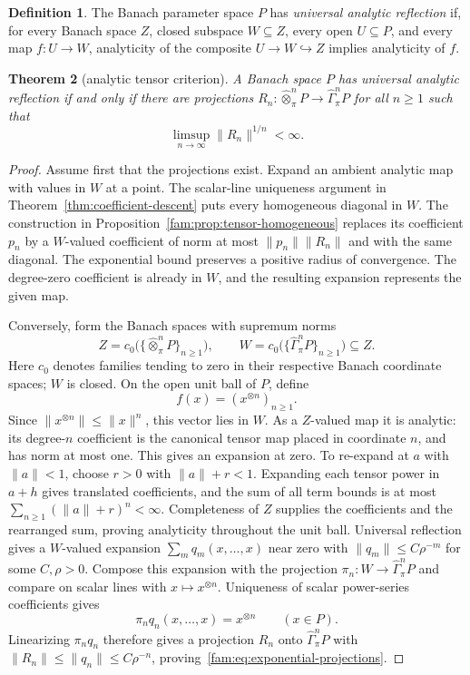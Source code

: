 \documentclass[11pt]{amsart}
\newtheorem{theorem}{Theorem}[section]
\theoremstyle{definition}
\newtheorem{definition}[theorem]{Definition}
\theoremstyle{remark}
\numberwithin{equation}{section}
\newcommand{\norm}[1]{\lVert #1\rVert}
\theoremstyle{plain}
\theoremstyle{definition}
\theoremstyle{plain}
\begin{document}
\begin{definition}\label{fam:def:universal-reflection}
The Banach parameter space $P$ has \emph{universal analytic reflection} if, for every Banach space $Z$, closed
subspace $W\subseteq Z$, every open $U\subseteq P$, and every map $f\colon U\to W$, analyticity of
the composite $U\to W\hookrightarrow Z$ implies analyticity of $f$.
\end{definition}

\begin{theorem}[analytic tensor criterion]\label{fam:thm:tensor-analytic}
A Banach space $P$ has universal analytic reflection if and only if there are projections
$R_n\colon \widehat\otimes^n_\pi P\to\widehat\Gamma^n_\pi P$ for all $n\ge1$ such that
\begin{equation}\label{fam:eq:exponential-projections}
 \limsup_{n\to\infty}\norm{R_n}^{1/n}<\infty.
\end{equation}
\end{theorem}

\begin{proof}
Assume first that the projections exist. Expand an ambient analytic map with values in $W$ at a point.
The scalar-line uniqueness argument in Theorem~\ref{thm:coefficient-descent} puts every homogeneous diagonal in $W$.
The construction in Proposition~\ref{fam:prop:tensor-homogeneous} replaces its coefficient $p_n$ by a
$W$\nobreakdash-valued coefficient of norm at most $\norm{p_n}\norm{R_n}$ and with the same diagonal.
The exponential bound preserves a positive radius of convergence. The degree-zero coefficient is
already in $W$, and the resulting expansion represents the given map.

Conversely, form the Banach spaces with supremum norms
\[
 Z=c_0\bigl(\{\widehat\otimes^n_\pi P\}_{n\ge1}\bigr),\qquad
 W=c_0\bigl(\{\widehat\Gamma^n_\pi P\}_{n\ge1}\bigr)\subseteq Z.
\]
Here $c_0$ denotes families tending to zero in their respective Banach coordinate spaces; $W$ is closed.
On the open unit ball of $P$, define
\[
 f(x)=(x^{\otimes n})_{n\ge1}.
\]
Since $\norm{x^{\otimes n}}\le\norm x^n$, this vector lies in $W$.
As a $Z$\nobreakdash-valued map it is analytic: its degree-$n$ coefficient is the canonical tensor map
placed in coordinate $n$, and has norm at most one. This gives an expansion at zero. To re-expand
at $a$ with $\norm a<1$, choose $r>0$ with $\norm a+r<1$. Expanding each tensor power in $a+h$
gives translated coefficients, and the sum of all term bounds is at most
$\sum_{n\ge1}(\norm a+r)^n<\infty$. Completeness of $Z$ supplies the coefficients and the
rearranged sum, proving analyticity throughout the unit ball. Universal reflection gives a $W$\nobreakdash-valued
expansion $\sum_mq_m(x,\ldots,x)$ near zero with $\norm{q_m}\le C\rho^{-m}$ for some $C,\rho>0$.
Compose this expansion with the projection $\pi_n\colon W\to\widehat\Gamma^n_\pi P$ and compare on scalar lines
with $x\mapsto x^{\otimes n}$. Uniqueness of scalar power-series coefficients gives
\[
 \pi_nq_n(x,\ldots,x)=x^{\otimes n}\qquad(x\in P).
\]
Linearizing $\pi_nq_n$ therefore gives a projection $R_n$ onto $\widehat\Gamma^n_\pi P$ with
$\norm{R_n}\le\norm{q_n}\le C\rho^{-n}$, proving~\eqref{fam:eq:exponential-projections}.
\end{proof}
\end{document}
